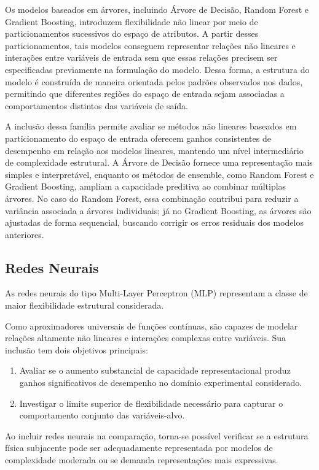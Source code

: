 Os modelos baseados em árvores, incluindo Árvore de Decisão, Random Forest e Gradient Boosting, introduzem flexibilidade não linear por meio de particionamentos sucessivos do espaço de atributos. A partir desses particionamentos, tais modelos conseguem representar relações não lineares e interações entre variáveis de entrada sem que essas relações precisem ser especificadas previamente na formulação do modelo. Dessa forma, a estrutura do modelo é construída de maneira orientada pelos padrões observados nos dados, permitindo que diferentes regiões do espaço de entrada sejam associadas a comportamentos distintos das variáveis de saída.

A inclusão dessa família permite avaliar se métodos não lineares baseados em particionamento do espaço de entrada oferecem ganhos consistentes de desempenho em relação aos modelos lineares, mantendo um nível intermediário de complexidade estrutural. A Árvore de Decisão fornece uma representação mais simples e interpretável, enquanto os métodos de ensemble, como Random Forest e Gradient Boosting, ampliam a capacidade preditiva ao combinar múltiplas árvores. No caso do Random Forest, essa combinação contribui para reduzir a variância associada a árvores individuais; já no Gradient Boosting, as árvores são ajustadas de forma sequencial, buscando corrigir os erros residuais dos modelos anteriores.
\subsection{Redes Neurais}

As redes neurais do tipo Multi-Layer Perceptron (MLP) representam a classe de maior flexibilidade estrutural considerada.

Como aproximadores universais de funções contínuas, são capazes de modelar relações altamente não lineares e interações complexas entre variáveis. Sua inclusão tem dois objetivos principais:

\begin{enumerate}
    \item Avaliar se o aumento substancial de capacidade representacional produz ganhos significativos de desempenho no domínio experimental considerado.
    \item Investigar o limite superior de flexibilidade necessário para capturar o comportamento conjunto das variáveis-alvo.
\end{enumerate}

Ao incluir redes neurais na comparação, torna-se possível verificar se a estrutura física subjacente pode ser adequadamente representada por modelos de complexidade moderada ou se demanda representações mais expressivas.

